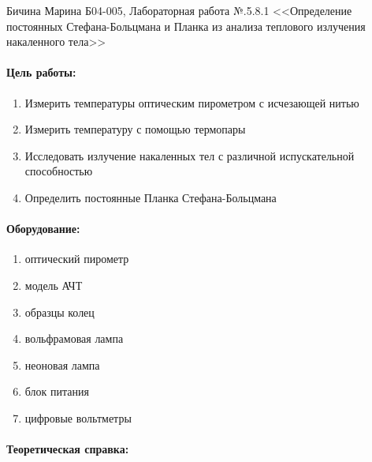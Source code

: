 \documentclass[a4paper,12pt]{article}
\author{Бичина Марина 
группа Б04-005 1 курса ФЭФМ}
\title{}
\date{}
\begin{document}

\begin{center}
\begin{Large}
{Бичина Марина Б04-005, Лабораторная работа №.5.8.1 <<Определение постоянных Стефана-Больцмана и Планка из анализа теплового излучения накаленного тела>> }
\end{Large}
\end{center}
\paragraph{Цель работы:} 
\begin{enumerate}
\itemsep0em
\item Измерить температуры оптическим пирометром с исчезающей нитью
\item Измерить температуру с помощью термопары
\item Исследовать излучение накаленных тел с различной испускательной способностью
\item Определить постоянные Планка  Стефана-Больцмана
\end{enumerate}
\paragraph{Оборудование:}
\begin{enumerate}
\itemsep0em
\item оптический пирометр
\item модель АЧТ
\item образцы колец
\item вольфрамовая лампа
\item неоновая лампа
\item блок питания
\item цифровые вольтметры
\end{enumerate}
\paragraph{Теоретическая справка:}
\end{document}
